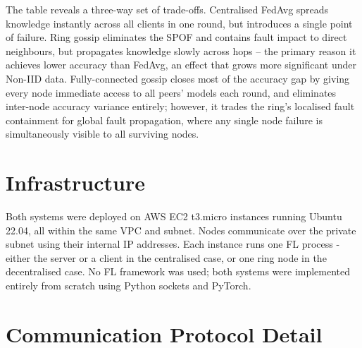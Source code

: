 \documentclass[12pt]{report}
\begin{document}
The table reveals a three-way set of trade-offs. Centralised FedAvg spreads
knowledge instantly across all clients in one round, but introduces a single
point of failure. Ring gossip eliminates the SPOF and contains fault impact to
direct neighbours, but propagates knowledge slowly across hops -- the primary
reason it achieves lower accuracy than FedAvg, an effect that grows more
significant under Non-IID data. Fully-connected gossip closes most of the
accuracy gap by giving every node immediate access to all peers' models each
round, and eliminates inter-node accuracy variance entirely; however, it
trades the ring's localised fault containment for global fault propagation,
where any single node failure is simultaneously visible to all surviving nodes.

\section{Infrastructure}

Both systems were deployed on AWS EC2 t3.micro instances running Ubuntu
22.04, all within the same VPC and subnet. Nodes communicate over the private
subnet using their internal IP addresses. Each instance runs one FL process -
either the server or a client in the centralised case, or one ring node in the
decentralised case. No FL framework was used; both systems were implemented
entirely from scratch using Python sockets and PyTorch.

\section{Communication Protocol Detail}
 
\end{document}
